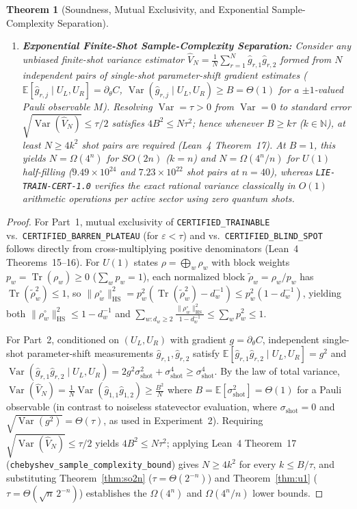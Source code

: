 \documentclass[11pt,a4paper]{article}
\newtheorem{theorem}{Theorem}[section]
\theoremstyle{definition}
\theoremstyle{remark}
\newcommand{\NN}{\mathbb{N}}
\newcommand{\Tr}{\operatorname{Tr}}
\newcommand{\Var}{\operatorname{Var}}
\newcommand{\HS}{\mathrm{HS}}
\newcommand{\certschema}{\texttt{LIE-TRAIN-CERT-1.0}}
\begin{document}
\begin{theorem}[Soundness, Mutual Exclusivity, and Exponential Sample-Complexity Separation]
\begin{enumerate}[leftmargin=1.8em,itemsep=2pt]
  \item \textbf{Exponential Finite-Shot Sample-Complexity Separation:} Consider any unbiased finite-shot variance estimator $\widehat{V}_N = \frac{1}{N}\sum_{r=1}^N \hat{g}_{r,1}\hat{g}_{r,2}$ formed from $N$ independent pairs of single-shot parameter-shift gradient estimates ($\mathbb{E}[\hat{g}_{r,j} \mid U_L, U_R] = \partial_\theta C$, $\Var(\hat{g}_{r,j} \mid U_L, U_R) \ge B = \Theta(1)$ for a $\pm 1$-valued Pauli observable $M$). Resolving $\Var = \tau > 0$ from $\Var = 0$ to standard error $\sqrt{\Var(\widehat{V}_N)} \le \tau/2$ satisfies $4 B^2 \le N \tau^2$; hence whenever $B \ge k\tau$ ($k \in \NN$), at least $N \ge 4 k^2$ shot pairs are required (Lean~4 Theorem~17). At $B=1$, this yields $N = \Omega(4^n)$ for $SO(2n)$ ($k=n$) and $N = \Omega(4^n/n)$ for $U(1)$ half-filling ($9.49\times 10^{24}$ and $7.23\times 10^{22}$ shot pairs at $n=40$), whereas \certschema{} verifies the exact rational variance classically in $O(1)$ arithmetic operations per active sector using zero quantum shots.
\end{enumerate}
\end{theorem}

\begin{proof}
For Part~1, mutual exclusivity of \texttt{CERTIFIED\_TRAINABLE} vs.\ \texttt{CERTIFIED\_BARREN\_PLATEAU} (for $\varepsilon < \tau$) and vs.\ \texttt{CERTIFIED\_BLIND\_SPOT} follows directly from cross-multiplying positive denominators (Lean~4 Theorems~15--16). For $U(1)$ states $\rho = \bigoplus_w \rho_w$ with block weights $p_w = \Tr(\rho_w) \ge 0$ ($\sum_w p_w = 1$), each normalized block $\tilde{\rho}_w = \rho_w / p_w$ has $\Tr(\tilde{\rho}_w^2) \le 1$, so $\|\rho_w^\circ\|_{\HS}^2 = p_w^2 (\Tr(\tilde{\rho}_w^2) - d_w^{-1}) \le p_w^2(1 - d_w^{-1})$, yielding both $\|\rho_w^\circ\|_{\HS}^2 \le 1 - d_w^{-1}$ and $\sum_{w: d_w \ge 2} \frac{\|\rho_w^\circ\|_{\HS}^2}{1 - d_w^{-1}} \le \sum_w p_w^2 \le 1$.

For Part~2, conditioned on $(U_L, U_R)$ with gradient $g = \partial_\theta C$, independent single-shot parameter-shift measurements $\hat{g}_{r,1}, \hat{g}_{r,2}$ satisfy $\mathbb{E}[\hat{g}_{r,1}\hat{g}_{r,2} \mid U_L, U_R] = g^2$ and $\Var(\hat{g}_{r,1}\hat{g}_{r,2} \mid U_L, U_R) = 2 g^2 \sigma_{\mathrm{shot}}^2 + \sigma_{\mathrm{shot}}^4 \ge \sigma_{\mathrm{shot}}^4$. By the law of total variance, $\Var(\widehat{V}_N) = \frac{1}{N}\Var(\hat{g}_{1,1}\hat{g}_{1,2}) \ge \frac{B^2}{N}$ where $B = \mathbb{E}[\sigma_{\mathrm{shot}}^2] = \Theta(1)$ for a Pauli observable (in contrast to noiseless statevector evaluation, where $\sigma_{\mathrm{shot}} = 0$ and $\sqrt{\Var(g^2)} = \Theta(\tau)$, as used in Experiment~2). Requiring $\sqrt{\Var(\widehat{V}_N)} \le \tau/2$ yields $4 B^2 \le N \tau^2$; applying Lean~4 Theorem~17 (\texttt{chebyshev\_sample\_complexity\_bound}) gives $N \ge 4 k^2$ for every $k \le B/\tau$, and substituting Theorem~\ref{thm:so2n} ($\tau = \Theta(2^{-n})$) and Theorem~\ref{thm:u1} ($\tau = \Theta(\sqrt{n}\,2^{-n})$) establishes the $\Omega(4^n)$ and $\Omega(4^n/n)$ lower bounds.
\end{proof}
\end{document}
